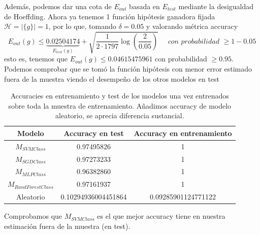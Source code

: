 \documentclass[11pt,a4paper]{article}
\theoremstyle{definition}
\begin{document}
	Además, podemos dar una cota de $E_{out}$ basada en $E_{test}$ mediante la desigualdad de Hoeffding. Ahora ya tenemos 1 función hipótesis ganadora fijada $\mathcal{H}=|\{g\}|=1$, por lo que, tomando $\delta=0.05$ y valorando métrica accuracy
	$$E_{out}(g) \leq \underbrace{0.02504174}_{E_{test}(g)}+\sqrt{\frac{1}{2\cdot 1797} \log \left(\frac{2}{0.05}\right)} \quad \textit{ con probabilidad } \geq 1-0.05$$
	esto es, tenemos que $E_{out}(g)\leq 0.04615475961$ con probabilidad $\geq 0.95$.\\
    
    Podemos comprobar que se tomó la función hipótesis con menor error estimado fuera de la muestra viendo el desempeño de los otros modelos en test
	\begin{table}[H]
	\begin{center}
	\begin{tabular}{|c|c|c|}
	\hline
	 Modelo & Accuracy en test & Accuracy en entrenamiento \\
	\hline \hline
	$M_{SVMClass}$ & 0.97495826 & 1 \\ \hline
	$M_{SGDClass}$ & 0.97273233 & 1\\ \hline
	$M_{MLPClass}$ & 0.96382860 & 1 \\ \hline
	$M_{RandForestClass}$ & 0.97161937 & 1  \\ \hline
	Aleatorio & 0.10294936004451864 & 0.09285901124771122 \\ \hline
	\end{tabular}
	\caption{Accuracies en entrenamiento y test de los modelos una vez entrenados sobre toda la muestra de entrenamiento. Añadimos accuracy de modelo aleatorio, se aprecia diferencia sustancial.}
	\label{tabla:sencilla}
	\end{center}
	\end{table}
	Comprobamos que $M_{SVMClass}$ es el que mejor accuracy tiene en nuestra estimación fuera de la muestra (en test).\\
	~\\
	
\end{document}
